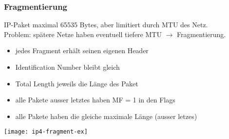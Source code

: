 \subsubsection{Fragmentierung}

IP-Paket maximal 65535 Bytes, aber limitiert durch MTU des Netz. \\
Problem: spätere Netze haben eventuell tiefere MTU $\rightarrow$ Fragmentierung.

\begin{itemize}
	\item jedes Fragment erhält seinen eigenen Header
	\item Identification Number bleibt gleich
	\item Total Length jeweils die Länge des Paket
	\item alle Pakete ausser letztes haben MF = 1 in den Flags
    \item alle Pakete haben die gleiche maximale Länge (ausser letzes)
\end{itemize}
\begin{center}
	\texttt{[image: ip4-fragment-ex]}
\end{center}








